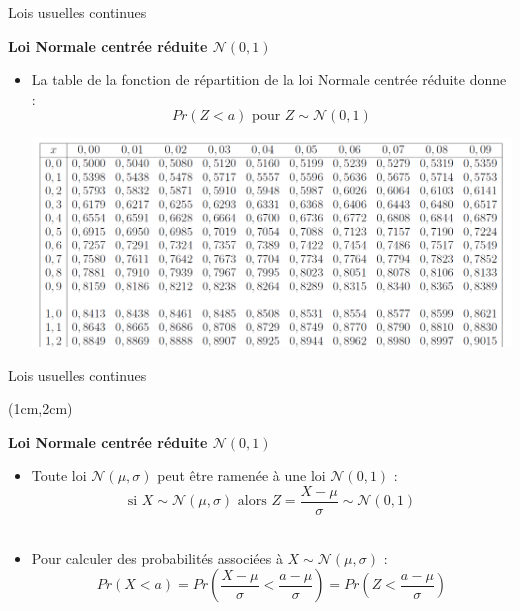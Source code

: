 \documentclass{beamer}
\begin{document}
\begin{frame}{Lois usuelles continues}


\begin{center}{\bf \Large Loi Normale centrée réduite $\mathcal{N}(0,1)$} \end{center}

\begin{itemize}
\item La table de la fonction de répartition de la loi Normale centrée réduite donne :
$$Pr(Z<a) \mbox{ pour } Z\sim \mathcal{N}(0,1)$$
 
\includegraphics[scale=0.38]{images/table_norm_CR.png}

\end{itemize}


\end{frame}





\begin{frame}{Lois usuelles continues}
\begin{textblock*}{\textwidth}(1cm,2cm)

\begin{center}{\bf \Large Loi Normale centrée réduite $\mathcal{N}(0,1)$} \end{center}

\begin{itemize}

\item Toute loi $\mathcal{N}(\mu,\sigma)$ peut être ramenée à une loi $\mathcal{N}(0,1)$ : \\
$$
\mbox{si } X\sim\mathcal{N}(\mu,\sigma) \mbox{ alors } Z=\displaystyle \frac{X-\mu }{\sigma}\sim \mathcal{N}(0,1)
$$
\

\item Pour calculer des probabilités associées à $X \sim \mathcal{N}(\mu,\sigma)$ :
$$
Pr(X<a) = Pr\left( \frac{X-\mu}{\sigma} < \frac{a-\mu}{\sigma}\right) = Pr\left(Z< \frac{a-\mu}{\sigma} \right)
$$

\end{itemize}

\end{textblock*}

\end{frame}
\end{document}
